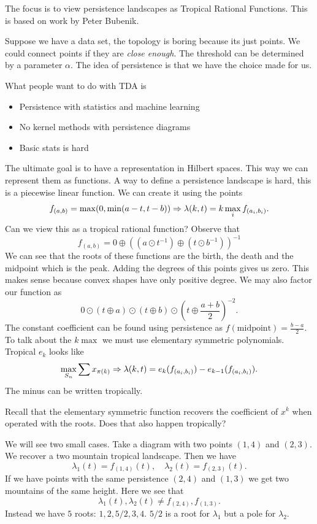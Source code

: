 \documentclass[12pt]{memoir}
\theoremstyle{definition}
\def\al{\alpha}
\def\la{\lambda}
\begin{document}
The focus is to view persistence landscapes as Tropical Rational Functions. This is based on work by Peter Bubenik.\par 
Suppose we have a data set, the topology is boring because its just points. We could connect points if they are \emph{close enough}. The threshold can be determined by a parameter $\al$. The idea of persistence is that we have the choice made for us.\par 
What people want to do with TDA is
\begin{itemize}
    \item Persistence with statistics and machine learning
    \item No kernel methods with persistence diagrams
    \item Basic stats is hard
\end{itemize}
The ultimate goal is to have a representation in Hilbert spaces. This way we can represent them as functions. A way to define a persistence landscape is hard, this is a piecewise linear function. We can create it using the points 
$$f_{(a,b)}=\max(0,\min(a-t,t-b))\To\la(k,t)=k\max_if_{(a_i,b_i)}.$$
Can we view this as a tropical rational function? Observe that 
$$f_{(a,b)}=0\oplus((a\odot t^{-1})\oplus(t\odot b^{-1}))^{-1}$$
We can see that the roots of these functions are the birth, the death and the midpoint which is the peak. Adding the degrees of this points gives us zero. This makes sense because convex shapes have only positive degree. We may also factor our function as 
$$0\odot(t\oplus a)\odot(t\oplus b)\odot(t\oplus \frac{a+b}{2})^{-2}.$$
The constant coefficient can be found using persistence as $f(\text{midpoint})=\frac{b-a}{2}$. To talk about the $k\max$ we must use elementary symmetric polynomials. Tropical $e_k$ looks like 
$$\max_{S_n}\sum x_{\pi(k)}\To \la(k,t)=e_k(f_{(a_i,b_i)})-e_{k-1}(f_{(a_i,b_i)}).$$
The minus can be written tropically.

\begin{significant}
    Recall that the elementary symmetric function recovers the coefficient of $x^k$ when operated with the roots. Does that also happen tropically?
\end{significant}

\begin{Ex}
    We will see two small cases. Take a diagram with two points $(1,4)$ and $(2,3)$. We recover a two mountain tropical landscape. Then we have 
    $$\la_1(t)=f_{(1,4)}(t),\quad\la_2(t)=f_{(2,3)}(t).$$
    If we have points with the same persistence $(2,4)$ and $(1,3)$ we get two mountains of the same height. Here we see that 
    $$\la_1(t),\la_2(t)\neq f_{(2,4)},f_{(1,3)}.$$
    Instead we have $5$ roots: $1,2,5/2,3,4$. $5/2$ is a root for $\la_1$ but a pole for $\la_2$.
\end{Ex}
\end{document}
